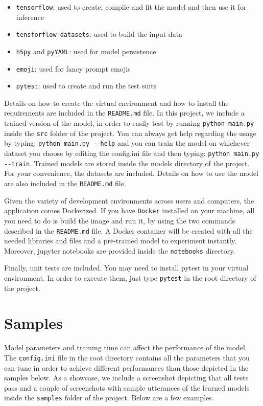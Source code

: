 \documentclass[10pt, twocolumn, a4paper]{article}
\begin{document}
\begin{itemize}
    \item \verb+tensorflow+: used to create, compile and fit the model and then use it for inference
    \item \verb+tensforflow-datasets+: used to build the input data
    \item \verb+h5py+ and \verb+pyYAML+: used for model persistence
    \item \verb+emoji+: used for fancy prompt emojis
    \item \verb+pytest+: used to create and run the test suits
\end{itemize}

Details on how to create the virtual environment and how to install the requirements are included in the \verb+README.md+ file. In this project, we include a trained version of the model, in order to easily test by running \verb+python main.py+ inside the \verb+src+ folder of the project. You can always get help regarding the usage by typing: \verb+python main.py --help+ and you can train the model on whichever dataset you choose by editing the config.ini file and then typing: \verb+python main.py --train+. Trained models are stored inside the models directory of the project. For your convenience, the datasets are included. Details on how to use the model are also included in the \verb+README.md+ file.

Given the variety of development environments across users and computers, the application comes Dockerized. If you have \verb+Docker+ installed on your machine, all you need to do is build the image and run it, by using the two commands described in the \verb+README.md+ file. A Docker container will be created with all the needed libraries and files and a pre-trained model to experiment instantly. Moreover, jupyter notebooks are provided inside the \verb+notebooks+ directory.

Finally, unit tests are included. You may need to install pytest in your virtual environment. In order to execute them, just type \verb+pytest+ in the root directory of the project.

\section{Samples}
Model parameters and training time can affect the performance of the model. The \verb+config.ini+ file in the root directory contains all the parameters that you can tune in order to achieve different performances than those depicted in the samples below. As a showcase, we include a screenshot depicting that all tests pass and a couple of screenshots with sample utterances of the learned models inside the \verb+samples+ folder of the project. Below are a few examples.
\end{document}
